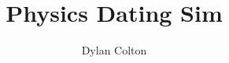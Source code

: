 \documentclass[12pt]{article}
\title{Physics Dating Sim}
\author{Dylan Colton}
\date{ }
\begin{document}
    \begin{titlepage}
        \maketitle
    \end{titlepage}
\end{document}
